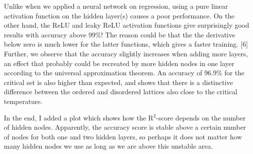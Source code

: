 Unlike when we applied a neural network on regression, using a pure linear activation function on the hidden layer(s) causes a poor performance. On the other hand, the ReLU and leaky ReLU activation functions give surprisingly good results with accuracy above 99\%! The reason could be that the the derivative below zero is much lower for the latter functions, which gives a faster training. [6] Further, we observe that the accuracy slightly increases when adding more layers, an effect that probably could be recreated by more hidden nodes in one layer according to the universal approximation theorem. An accuracy of 96.9\% for the critical set is also higher than expected, and shows that there is a distinctive difference between the ordered and disordered lattices also close to the critical temperature. 

In the end, I added a plot which shows how the R$^2$-score depends on the number of hidden nodes. Apparently, the accuracy score is stable above a certain number of nodes for both one and two hidden layers, so perhaps it does not matter how many hidden nodes we use as long as we are above this unstable area. 

